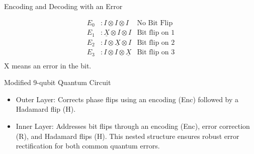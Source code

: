 \begin{frame}{Encoding and Decoding with an Error}

    \begin{align*}
    E_0 & : I \otimes I \otimes I & \text{No Bit Flip} \\
    E_1 & : \underline{X} \otimes I \otimes I & \text{Bit flip on 1} \\
    E_2 & : I \otimes \underline{X} \otimes I & \text{Bit flip on 2} \\
    E_3 & : I \otimes I \otimes \underline{X} & \text{Bit flip on 3} \\
    \end{align*}
    X means an error in the bit.

\end{frame}



\begin{frame}{Modified 9-qubit Quantum Circuit}
    \centering
    \begin{itemize}
        \item Outer Layer: Corrects phase flips using an encoding (Enc) followed by a Hadamard flip (H).
        \item Inner Layer: Addresses bit flips through an encoding (Enc), error correction (R), and Hadamard flips (H). This nested structure ensures robust error rectification for both common quantum errors.
    \end{itemize}
\end{frame}








